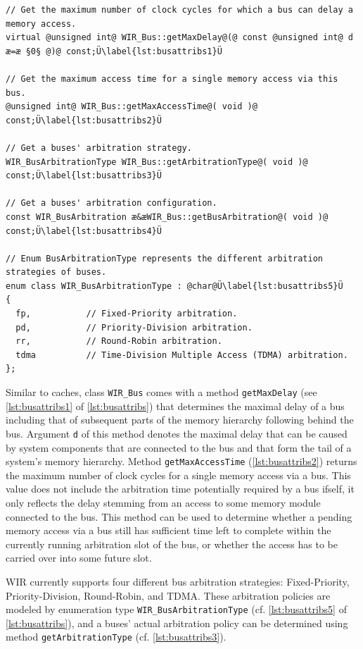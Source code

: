 \begin{lstlisting}[style=code,float=t,caption={Characteristic Attributes of Class \texttt{WIR\_Bus}},label=lst:busattribs]
// Get the maximum number of clock cycles for which a bus can delay a memory access.
virtual @unsigned int@ WIR_Bus::getMaxDelay@(@ const @unsigned int@ d æ=æ §0§ @)@ const;Ü\label{lst:busattribs1}Ü

// Get the maximum access time for a single memory access via this bus.
@unsigned int@ WIR_Bus::getMaxAccessTime@( void )@ const;Ü\label{lst:busattribs2}Ü

// Get a buses' arbitration strategy.
WIR_BusArbitrationType WIR_Bus::getArbitrationType@( void )@ const;Ü\label{lst:busattribs3}Ü

// Get a buses' arbitration configuration.
const WIR_BusArbitration æ&æWIR_Bus::getBusArbitration@( void )@ const;Ü\label{lst:busattribs4}Ü

// Enum BusArbitrationType represents the different arbitration strategies of buses.
enum class WIR_BusArbitrationType : @char@Ü\label{lst:busattribs5}Ü
{
  fp,           // Fixed-Priority arbitration.
  pd,           // Priority-Division arbitration.
  rr,           // Round-Robin arbitration.
  tdma          // Time-Division Multiple Access (TDMA) arbitration.
};
\end{lstlisting}

Similar to caches, class \texttt{WIR\_Bus} comes with a method \texttt{getMaxDelay} (see \cref{lst:busattribs1} of \cref{lst:busattribs}) that determines the maximal delay of a bus including that of subsequent parts of the memory hierarchy following behind the bus.
Argument \texttt{d} of this method denotes the maximal delay that can be caused by system components that are connected to the bus and that form the tail of a system's memory hierarchy.
Method \texttt{getMaxAccessTime} (\cref{lst:busattribs2}) returns the maximum number of clock cycles for a single memory access via a bus.
This value does not include the arbitration time potentially required by a bus ifself, it only reflects the delay stemming from an access to some memory module connected to the bus.
This method can be used to determine whether a pending memory access via a bus still has sufficient time left to complete within the currently running arbitration slot of the bus, or whether the access has to be carried over into some future slot.

\gls{WIR} currently supports four different bus arbitration strategies: Fixed-Priority, Priority-Division, Round-Robin, and \acrfull{TDMA}.
These arbitration policies are modeled by enumeration type \texttt{WIR\_BusAr\-bitrationType} (cf. \cref{lst:busattribs5} of \cref{lst:busattribs}), and a buses' actual arbitration policy can be determined using method \texttt{getArbitrationType} (cf. \cref{lst:busattribs3}).

